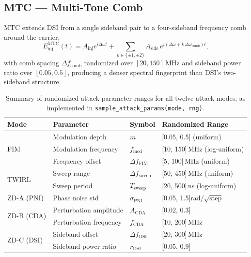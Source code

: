 \documentclass[12pt, a4paper]{report}
\begin{document}
\subsection{MTC — Multi-Tone Comb}
MTC extends DSI from a single sideband pair to a four-sideband frequency comb around the carrier,
\begin{equation}
    E_{\text{inj}}^{\text{MTC}}(t) = A_{\text{inj}} e^{i\Delta\omega t} + \sum_{k \in \{\pm 1, \pm 2\}} A_{\text{side}}\, e^{i(\Delta\omega + k\,\Delta\omega_{\text{comb}})t},
\end{equation}
with comb spacing $\Delta f_{\text{comb}}$ randomized over $[20, 150]\,\text{MHz}$ and sideband power ratio over $[0.05, 0.5]$, producing a denser spectral fingerprint than DSI's two-sideband structure.

\begin{table}[h]
\centering
\caption{Summary of randomized attack parameter ranges for all twelve attack modes, as implemented in \texttt{sample\_attack\_params(mode, rng)}.}
\label{tab:attack_params}
\begin{tabular}{@{}llll@{}}
\toprule
\textbf{Mode} & \textbf{Parameter} & \textbf{Symbol} & \textbf{Randomized Range} \\
\midrule
\multirow{3}{*}{FIM}
    & Modulation depth     & $m$                    & [0.05, 0.5] (uniform) \\
    & Modulation frequency & $f_{\text{mod}}$       & [10, 150]\,MHz (log-uniform) \\
    & Frequency offset     & $\Delta f_{\text{FIM}}$& [5, 100]\,MHz (uniform) \\
\midrule
\multirow{2}{*}{TWIRL}
    & Sweep range          & $\Delta f_{\text{sweep}}$ & [50, 450]\,MHz (uniform) \\
    & Sweep period         & $T_{\text{sweep}}$        & [20, 500]\,ns (log-uniform) \\
\midrule
ZD-A (PNI) & Phase noise std      & $\sigma_{\text{PNI}}$  & [0.05, 1.5]\;$\text{rad}/\!\sqrt{\text{step}}$ \\
\midrule
\multirow{2}{*}{ZD-B (CDA)}
    & Perturbation amplitude & $A_{\text{CDA}}$ & [0.02, 0.3] \\
    & Perturbation frequency & $f_{\text{CDA}}$ & [10, 200]\,MHz \\
\midrule
\multirow{2}{*}{ZD-C (DSI)}
    & Sideband offset      & $\Delta f_{\text{DSI}}$ & [20, 300]\,MHz \\
    & Sideband power ratio & $r_{\text{DSI}}$        & [0.05, 0.9] \\

\end{tabular}
\end{table}
\end{document}
